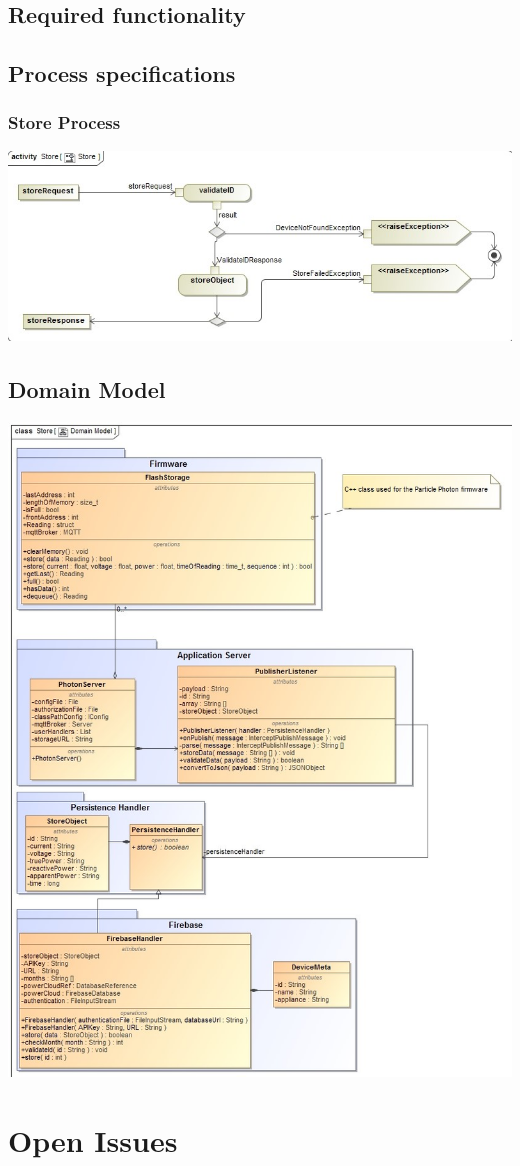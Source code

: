 \documentclass{article}
\begin{document}
\subsection{Required functionality}
\subsection{Process specifications}
\subsubsection{Store Process}
	\includegraphics[width=\textwidth]{images/Store.jpg}  \\
	\newpage
\subsection{Domain Model}
	\includegraphics[width=\textwidth]{images/Domain Model.jpg}  \\
\section{Open Issues}
\end{document}
